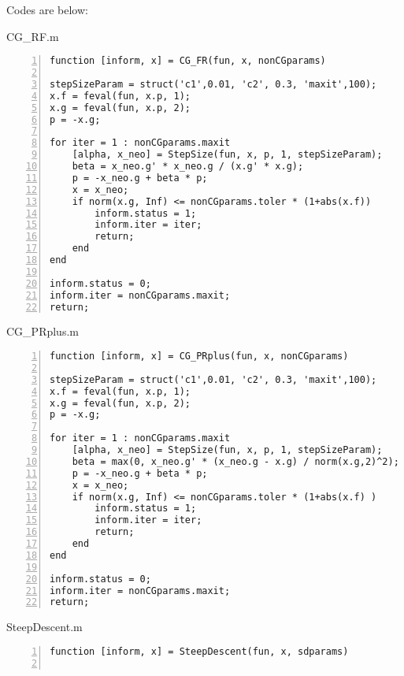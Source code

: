 \documentclass[12pt]{article}
\begin{document}
\begin{enumerate}
Codes are below:

\bigskip

CG\_RF.m

\bigskip

\begin{lstlisting}[language={[ANSI]C}, numbers=left, numberstyle=\tiny, frame=shadowbox, basicstyle=\ttfamily\small, showspaces=false, breaklines=true, showstringspaces=false, showtabs=false]
function [inform, x] = CG_FR(fun, x, nonCGparams)

stepSizeParam = struct('c1',0.01, 'c2', 0.3, 'maxit',100);
x.f = feval(fun, x.p, 1);
x.g = feval(fun, x.p, 2);
p = -x.g;

for iter = 1 : nonCGparams.maxit
    [alpha, x_neo] = StepSize(fun, x, p, 1, stepSizeParam);
    beta = x_neo.g' * x_neo.g / (x.g' * x.g);
    p = -x_neo.g + beta * p;
    x = x_neo;
    if norm(x.g, Inf) <= nonCGparams.toler * (1+abs(x.f))
        inform.status = 1;
        inform.iter = iter;
        return;
    end
end

inform.status = 0;
inform.iter = nonCGparams.maxit;
return;
\end{lstlisting}


\bigskip

CG\_PRplus.m

\bigskip

\begin{lstlisting}[language={[ANSI]C}, numbers=left, numberstyle=\tiny, frame=shadowbox, basicstyle=\ttfamily\small, showspaces=false, breaklines=true, showstringspaces=false, showtabs=false]
function [inform, x] = CG_PRplus(fun, x, nonCGparams)

stepSizeParam = struct('c1',0.01, 'c2', 0.3, 'maxit',100);
x.f = feval(fun, x.p, 1);
x.g = feval(fun, x.p, 2);
p = -x.g;

for iter = 1 : nonCGparams.maxit
    [alpha, x_neo] = StepSize(fun, x, p, 1, stepSizeParam);
    beta = max(0, x_neo.g' * (x_neo.g - x.g) / norm(x.g,2)^2);
    p = -x_neo.g + beta * p;
    x = x_neo;
    if norm(x.g, Inf) <= nonCGparams.toler * (1+abs(x.f) )
        inform.status = 1;
        inform.iter = iter;
        return;
    end
end

inform.status = 0;
inform.iter = nonCGparams.maxit;
return;
\end{lstlisting}


\bigskip

SteepDescent.m

\bigskip

\begin{lstlisting}[language={[ANSI]C}, numbers=left, numberstyle=\tiny, frame=shadowbox, basicstyle=\ttfamily\small, showspaces=false, breaklines=true, showstringspaces=false, showtabs=false]
function [inform, x] = SteepDescent(fun, x, sdparams)


\end{lstlisting}
\end{enumerate}
\end{document}
